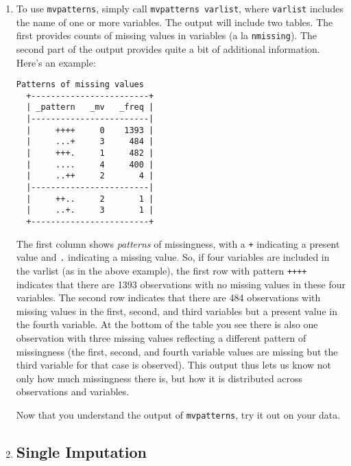 \documentclass[a4paper,12pt]{article}
\begin{document}
\begin{enumerate}
\item To use \texttt{mvpatterns}, simply call \texttt{mvpatterns varlist}, where \texttt{varlist} includes the name of one or more variables. The output will include two tables. The first provides counts of missing values in variables (a la \texttt{nmissing}). The second part of the output provides quite a bit of additional information. Here's an example:
\begin{verbatim}
Patterns of missing values
  +------------------------+
  | _pattern   _mv   _freq |
  |------------------------|
  |     ++++     0    1393 |
  |     ...+     3     484 |
  |     +++.     1     482 |
  |     ....     4     400 |
  |     ..++     2       4 |
  |------------------------|
  |     ++..     2       1 |
  |     ..+.     3       1 |
  +------------------------+
\end{verbatim}

The first column shows {\em patterns} of missingness, with a \texttt{+} indicating a present value and \texttt{.} indicating a missing value. So, if four variables are included in the varlist (as in the above example), the first row with pattern \texttt{++++} indicates that there are 1393 observations with no missing values in these four variables. The second row indicates that there are 484 observations with missing values in the first, second, and third variables but a present value in the fourth variable. At the bottom of the table you see there is also one observation with three missing values reflecting a different pattern of missingness (the first, second, and fourth variable values are missing but the third variable for that case is observed). This output thus lets us know not only how much missingness there is, but how it is distributed across observations and variables.

Now that you understand the output of \texttt{mvpatterns}, try it out on your data.


\item %

\subsection*{Single Imputation}


\end{enumerate}
\end{document}
